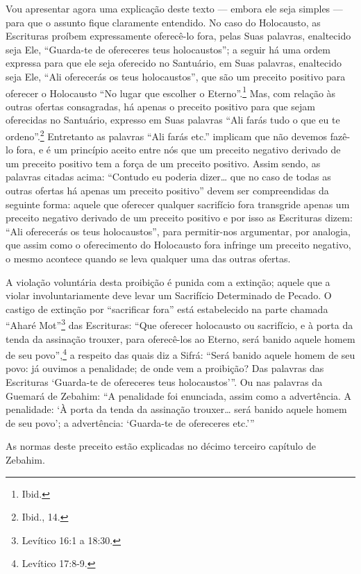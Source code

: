 Vou apresentar agora uma explicação deste texto --- embora ele seja
simples --- para que o assunto fique claramente entendido. No caso do
Holocausto, as Escrituras proíbem expressamente oferecê-lo fora, pelas
Suas palavras, enaltecido seja Ele, ``Guarda-te de ofereceres teus
holocaustos''; a seguir há uma ordem expressa para que ele seja
oferecido no Santuário, em Suas palavras, enaltecido seja Ele, ``Ali
oferecerás os teus holocaustos'', que são um preceito positivo para
oferecer o Holocausto ``No lugar que escolher o Eterno''.\footnote{Ibid.} Mas,
com relação às outras ofertas consagradas, há apenas o preceito
positivo para que sejam oferecidas no Santuário, expresso em Suas
palavras ``Ali farás tudo o que eu te ordeno''.\footnote{Ibid., 14.} Entretanto as
palavras ``Ali farás etc.'' implicam que não devemos fazê-lo fora, e é
um princípio aceito entre nós que um preceito negativo derivado de um
preceito positivo tem a força de um preceito positivo. Assim sendo, as
palavras citadas acima: ``Contudo eu poderia dizer\ldots{} que no caso de
todas as outras ofertas há apenas um preceito positivo'' devem ser
compreendidas da seguinte forma: aquele que oferecer qualquer
sacrifício fora transgride apenas um preceito negativo derivado de um
preceito positivo e por isso as Escrituras dizem: ``Ali oferecerás os
teus holocaustos'', para permitir-nos argumentar, por analogia, que
assim como o oferecimento do Holocausto fora infringe um preceito
negativo, o mesmo acontece quando se leva qualquer uma das outras
ofertas.

A violação voluntária desta proibição é punida com a extinção; aquele
que a violar involuntariamente deve levar um Sacrifício Determinado de
Pecado. O castigo de extinção por ``sacrificar fora'' está estabelecido
na parte chamada ``Aharé Mot''\footnote{Levítico 16:1 a 18:30.} das Escrituras:
``Que oferecer holocausto ou sacrifício, e à porta da tenda da assinação
trouxer, para oferecê-los ao Eterno, será banido aquele homem de seu
povo'',\footnote{Levítico 17:8-9.} a respeito das quais diz a Sifrá: ``Será
banido aquele homem de seu povo: já ouvimos a penalidade; de onde vem a
proibição? Das palavras das Escrituras `Guarda-te de ofereceres teus
holocaustos'''. Ou nas palavras da Guemará de Zebahim: ``A penalidade
foi enunciada, assim como a advertência. A penalidade: `À porta da tenda
da assinação trouxer\ldots{} será banido aquele homem de seu povo'; a
advertência: `Guarda-te de ofereceres etc.'''

As normas deste preceito estão explicadas no décimo terceiro capítulo
de Zebahim.

